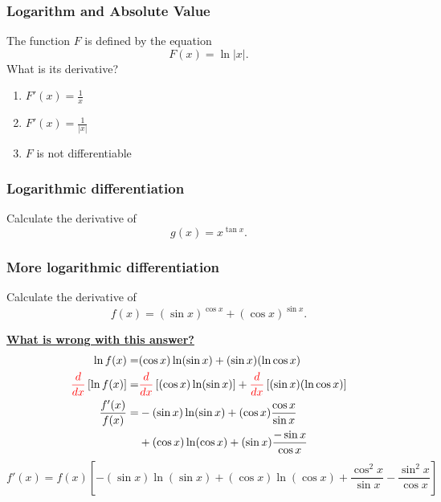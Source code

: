 \documentclass[14pt]{beamer}
\newcommand {\DS} [1] {${\displaystyle #1}$}
\newcommand{\setsize}[1]{\fontsize{#1}{#1}\selectfont} %
\newcommand{\smallerfont}{\setsize{13}} %
\begin{document}
\begin{frame}[t]
\frametitle{Logarithm and Absolute Value}

The function $F$ is defined by the equation
	$$F(x) = \ln |x| .$$
What is its derivative?
\vfill
	\begin{enumerate}
		\item  \DS{F'(x) = \frac{1}{x}}
\vfill
		\item  \DS{F'(x) = \frac{1}{|x|}}
\vfill
		\item  $F$ is not differentiable
\vfill
	\end{enumerate}
\end{frame}

\begin{frame}[t]
\frametitle{Logarithmic differentiation}

\vspace{5mm} 
	\begin{block}{}
Calculate the derivative of 
	$$
		g(x)  = x^{\tan x}.
	$$
	\end{block}

\end{frame}


\begin{frame}[t]
\smallerfont
\frametitle{More logarithmic differentiation}

\begin{block}{}
Calculate the derivative of 
	$$
		f(x) = \left( \sin x \right)^{\cos x} + \left( \cos x \right)^{\sin x}.
	$$
\end{block}


\pause \vfill

{\bf \underline{What is wrong with this answer?}}
	\begin{align*}
		\ln f(x)  = & (\cos x) \ln ( \sin x )+ ( \sin x ) ( \ln \cos x ) \\
		{\color{red} \frac{d}{dx}} \left[  \ln f(x) \right]  = & {\color{red} \frac{d}{dx}} \left[ (\cos x) \ln ( \sin x ) \right] + 
			 {\color{red} \frac{d}{dx}} \left[ ( \sin x ) ( \ln \cos x ) \right] \\
		\frac{f'(x)}{f(x)}  = & - ( \sin x ) \ln (\sin x) + (\cos x ) \frac{\cos x}{\sin x}  \\
				& + ( \cos x ) \ln (\cos x) + (\sin x ) \frac{- \sin x}{\cos x}
	\end{align*}
	$${f'(x) = f(x) \left[ - (\sin x) \ln(\sin x) + (\cos x) \ln (\cos x) + \frac{\cos^2 x}{\sin x} - \frac{\sin^2 x}{\cos x} \right]}$$
\end{frame}
\end{document}
